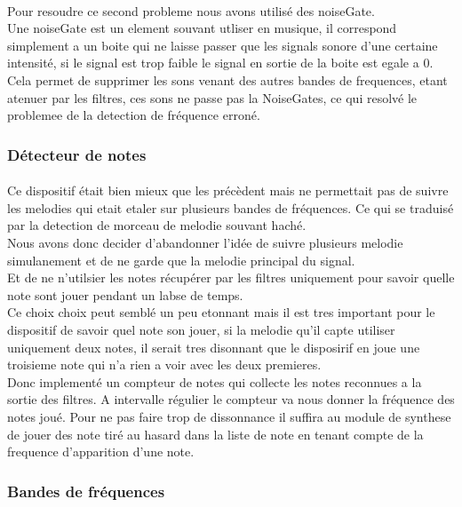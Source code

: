 \documentclass[a4paper, titlepage, oneside, 12pt]{article}%
\begin{document}
\paragraph{}
Pour resoudre ce second probleme nous avons utilisé des noiseGate.\\
Une noiseGate est un element souvant utliser en musique, il correspond simplement a un boite qui ne laisse passer que les signals sonore d'une certaine intensité, si le signal est trop faible le signal en sortie de la boite est egale a 0.
Cela permet de supprimer les sons venant des autres bandes de frequences, etant atenuer par les filtres, ces sons ne passe pas la NoiseGates, ce qui resolvé le problemee de la detection de fréquence erroné.

\subsubsection{Détecteur de notes}
\paragraph{}
Ce dispositif était bien mieux que les précèdent mais ne permettait pas de suivre les melodies qui etait etaler sur plusieurs bandes de fréquences. Ce qui se traduisé par la detection de morceau de melodie souvant haché.\\
Nous avons donc decider d'abandonner l'idée de suivre plusieurs melodie simulanement et de ne garde que la melodie principal du signal. \\
Et de ne n'utilsier les notes récupérer par les filtres uniquement  pour savoir quelle note sont jouer pendant un labse de temps.\\
Ce choix choix peut semblé un peu etonnant mais il est tres important pour le dispositif de savoir quel note son jouer, si la melodie qu'il capte utiliser uniquement deux notes, il serait tres disonnant que le disposirif en joue une troisieme note qui n'a rien a voir avec les deux premieres.\\
Donc implementé un compteur de notes qui collecte les notes reconnues a la sortie des filtres. A intervalle régulier le compteur va nous donner la fréquence des notes joué. Pour ne pas faire trop de dissonnance il suffira au module de synthese de jouer des note tiré au hasard dans la liste de note en tenant compte de la frequence d'apparition d'une note.

\subsubsection{Bandes de fréquences}
\end{document}

